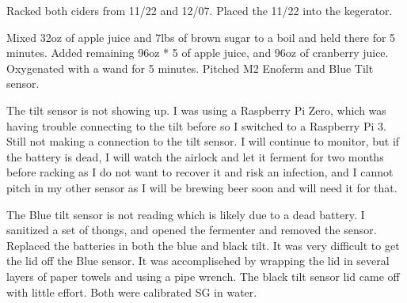 \def\todaysdate{20210108}
\newday{\todaysdate}\label{\todaysdate}


\begin{my_itemize}
    \item Racked both ciders from 11/22 and 12/07.  Placed the 11/22 into the kegerator.
\end{my_itemize}

\def\todaysdate{20210530}
\newday{\todaysdate}\label{\todaysdate}


\begin{my_itemize}
    \item Mixed 32oz of apple juice and 7lbs of brown sugar to a boil and held there for 5 minutes.  Added remaining 96oz * 5 of apple juice, and 96oz of cranberry juice.  Oxygenated with a wand for 5 minutes.  Pitched M2 Enoferm and Blue Tilt sensor.
    \item The tilt sensor is not showing up.  I was using a Raspberry Pi Zero, which was having trouble connecting to the tilt before so I switched to a Raspberry Pi 3.  Still not making a connection to the tilt sensor.  I will continue to monitor, but if the battery is dead, I will watch the airlock and let it ferment for two months before racking as I do not want to recover it and risk an infection, and I cannot pitch in my other sensor as I will be brewing beer soon and will need it for that.
\end{my_itemize}

\def\todaysdate{20210603}
\newday{\todaysdate}\label{\todaysdate}


The Blue tilt sensor is not reading which is likely due to a dead battery.  I sanitized a set of thongs, and opened the fermenter and removed the sensor.  Replaced the batteries in both the blue and black tilt.  It was very difficult to get the lid off the Blue sensor.  It was accomplisehed by wrapping the lid in several layers of paper towels and using a pipe wrench.  The black tilt sensor lid came off with little effort.  Both were calibrated SG in water.  

